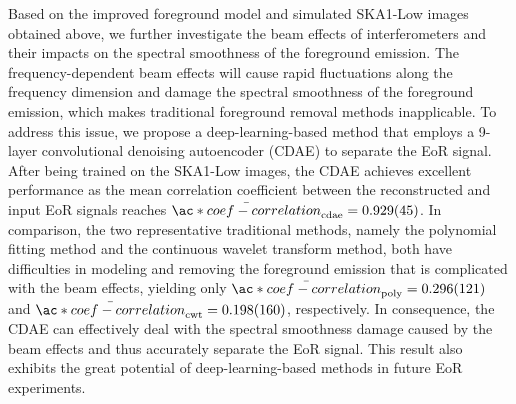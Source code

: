 \begin{englishabstract}
Based on the improved foreground model and simulated SKA1-Low images
obtained above, we further investigate the beam effects of
interferometers and their impacts on the spectral smoothness of
the foreground emission.
The frequency-dependent beam effects will cause
rapid fluctuations along the frequency dimension and damage the
spectral smoothness of the foreground emission, which makes
traditional foreground removal methods inapplicable.
To address this issue, we propose a deep-learning-based method
that employs a 9-layer convolutional denoising autoencoder (CDAE) to
separate the EoR signal.
After being trained on the SKA1-Low images, the CDAE achieves excellent
performance as the mean correlation coefficient between 
the reconstructed and input EoR signals reaches
$\bar{\ac*{coef-correlation}}_{\R{cdae}} = \num{0.929 +- 0.045}$.
In comparison, the two representative traditional methods, namely the
polynomial fitting method and the continuous wavelet transform method,
both have difficulties in modeling and removing the foreground emission
that is complicated with the beam effects, yielding only
$\bar{\ac*{coef-correlation}}_{\R{poly}} = \num{0.296 +- 0.121}$ and
$\bar{\ac*{coef-correlation}}_{\R{cwt}} = \num{0.198 +- 0.160}$,
respectively.
In consequence, the CDAE can effectively deal with the spectral
smoothness damage caused by the beam effects and thus accurately
separate the EoR signal.
This result also exhibits the great potential of deep-learning-based
methods in future EoR experiments.

\end{englishabstract}
